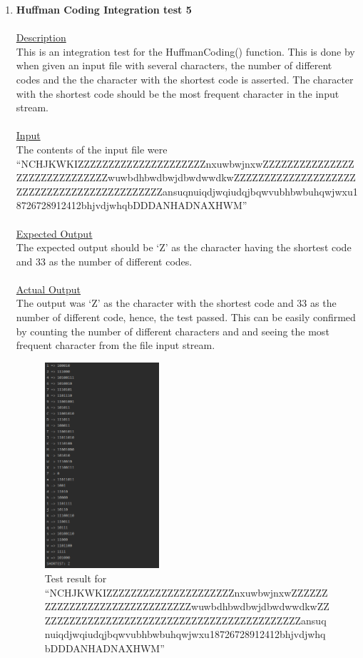 \documentclass{article}
\newcommand{\quotes}[1]{``#1''}
\begin{document}
\begin{enumerate}
					
					\item \textbf{Huffman Coding Integration test 5}\\\\
		\underline{Description}\\
		\indent This is an integration test for the HuffmanCoding() function. This is done by when given an input file with several characters, the number of different codes and the the character with the shortest code is asserted. The character with the shortest code should be the most frequent character in the input stream.\\\\
		\underline{Input}\\
		\indent The contents of the input file were \quotes{NCHJKWKIZZZZZZZZZZZZZZZZZZZZZnxuwbwjnxwZZZZZZZZZZZZZZZZZZZZZZZZZZZZZZwuwbdhbwdbwjdbwdwwdkwZZZZZZZZZZZZZZZZZZZZZZZZZZZZZZZZZZZZZZZZZZZZansuqnuiqdjwqiudqjbqwvubhbwbuhqwjwxu18726728912412bhjvdjwhqbDDDANHADNAXHWM}\\	\\
		\underline{Expected Output}\\
		\indent The expected output should be `Z' as the character having the shortest code and 33 as the number of different codes.\\\\
		\underline{Actual Output}\\
		The output was `Z' as the character with the shortest code and 33 as the number of different code, hence, the test passed. This can be easily confirmed by counting the number of different characters and and seeing the most frequent character from the file input stream.
									\begin{figure}[H]
					\centering
			 			\includegraphics[width=0.4\textwidth]{hctest3.png}
			 			\centering
			  			\caption{Test result for \quotes{NCHJKWKIZZZZZZZZZZZZZZZZZZZZZnxuwbwjnxwZZZZZZZZZZZZZZZZZZZZZZZZZZZZZZwuwbdhbwdbwjdbwdwwdkwZZZZZZZZZZZZZZZZZZZZZZZZZZZZZZZZZZZZZZZZZZZZansuqnuiqdjwqiudqjbqwvubhbwbuhqwjwxu18726728912412bhjvdjwhqbDDDANHADNAXHWM}}
			  			\label{fig:hctest3}
					\end{figure}
					

\end{enumerate}
\end{document}
